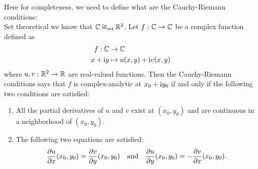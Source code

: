\noindent Here for completeness, we need to define what are the Cauchy-Riemann conditions:\\
Set theoretical we know that \(\mathbb C \operatorname{\cong_{\text{set}}} \mathbb R^2\). Let \(f: \mathbb C \to \mathbb C\) be a complex function defined as
\begin{equation}
	\begin{aligned}
		f: \mathbb C    & \to \mathbb C                       \\
		x + \mathrm{i} y & \mapsto u(x, y) + \mathrm{i} v(x, y)
	\end{aligned}
\end{equation}
where \(u, v: \mathbb R^2 \to \mathbb R\) are real-valued functions. Then the Cauchy-Riemann conditions says that \(f\) is complex-analytic at \(x_0 + \mathrm{i} y_0\) if and only if the following two conditions are satisfied:
\begin{enumerate}
	\item All the partial derivatives of \(u\) and \(v\) exist at \((x_0, y_0)\) and are continuous in a neighborhood of \((x_0, y_0)\).
	\item The following two equations are satisfied:
	      \begin{equation}
		      \pdv{u}{x} \qty(x_0, y_0) = \pdv{v}{y} \qty(x_0, y_0) \quad \text{and} \quad \pdv{u}{y} \qty(x_0, y_0) = -\pdv{v}{x} \qty(x_0, y_0).
	      \end{equation}
\end{enumerate}
